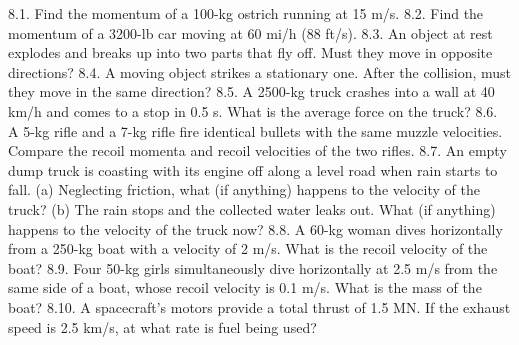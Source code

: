 






8.1. Find the momentum of a 100-kg ostrich running at 15 m/s.
8.2. Find the momentum of a 3200-lb car moving at 60 mi/h (88 ft/s).
8.3. An object at rest explodes and breaks up into two parts that fly off. Must they move in opposite directions?
8.4. A moving object strikes a stationary one. After the collision, must they move in the same direction?
8.5. A 2500-kg truck crashes into a wall at 40 km/h and comes to a stop in 0.5 s. What is the average force on the truck?
8.6. A 5-kg rifle and a 7-kg rifle fire identical bullets with the same muzzle velocities. Compare the recoil momenta and recoil velocities of the two rifles.
8.7. An empty dump truck is coasting with its engine off along a level road when rain starts to fall.
    (a) Neglecting friction, what (if anything) happens to the velocity of the truck?
    (b) The rain stops and the collected water leaks out. What (if anything) happens to the velocity of the truck now?
8.8. A 60-kg woman dives horizontally from a 250-kg boat with a velocity of 2 m/s. What is the recoil velocity of the boat?
8.9. Four 50-kg girls simultaneously dive horizontally at 2.5 m/s from the same side of a boat, whose recoil velocity is 0.1 m/s. What is the mass of the boat?
8.10. A spacecraft’s motors provide a total thrust of 1.5 MN. If the exhaust speed is 2.5 km/s, at what rate is fuel being used?


